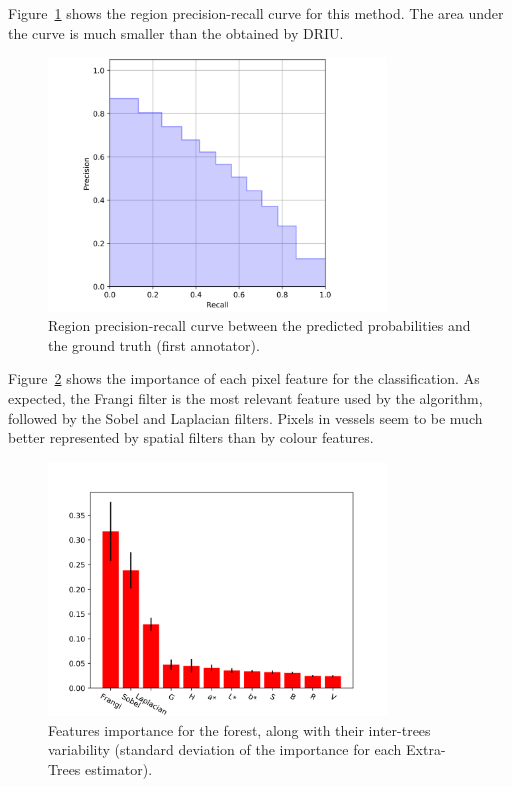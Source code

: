 Figure~\ref{fig:pr} shows the region precision-recall curve for this method. The area under the curve is much smaller than the obtained by DRIU.

\begin{figure}
  \centering
  \includegraphics[width=0.8\textwidth]{figures/precision-recall}
  \caption{Region precision-recall curve between the predicted probabilities and the ground truth (first annotator).}
  \label{fig:pr}
\end{figure}

Figure~\ref{fig:importance} shows the importance of each pixel feature for the classification. As expected, the Frangi filter is the most relevant feature used by the algorithm, followed by the Sobel and Laplacian filters. Pixels in vessels seem to be much better represented by spatial filters than by colour features.

\begin{figure}
  \centering
  \includegraphics[width=0.8\textwidth]{figures/importances}
  \caption{Features importance for the forest, along with their inter-trees variability (standard deviation of the importance for each Extra-Trees estimator).} \label{fig:importance}
\end{figure}
